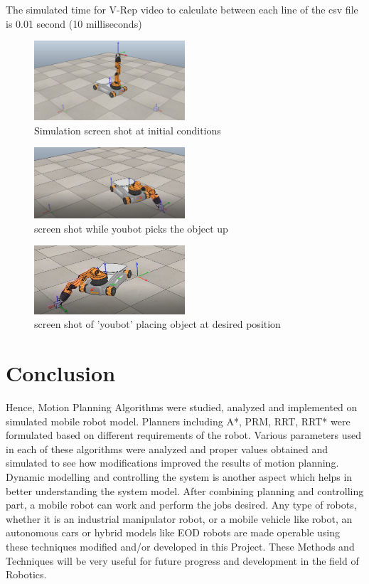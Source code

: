 \documentclass[12pt]{article}
\begin{document}
 The simulated time for V-Rep video to calculate between each line of the csv file is 0.01 second (10 milliseconds)

 
\begin{figure}[H]
\centering
\includegraphics[width=0.5\textwidth]{Initial_vrep_simulation.PNG}
\captionsetup{labelformat=empty}
\caption{Simulation screen shot at initial conditions}
\end{figure}
 
\begin{figure}[H]
\centering
\includegraphics[width=0.5\textwidth]{first_end.PNG}
\captionsetup{labelformat=empty}
\caption{screen shot while youbot picks the object up}
\end{figure}
 
\begin{figure}[H]
\centering
\includegraphics[width=0.5\textwidth]{final_end.PNG}
\captionsetup{labelformat=empty}
\caption{screen shot of 'youbot' placing object at desired position}
\end{figure}


\newpage
\section{Conclusion}
Hence, Motion Planning Algorithms were studied, analyzed and implemented on simulated mobile robot model. Planners including A*, PRM, RRT, RRT* were formulated based on different requirements of the robot. Various parameters used in each of these algorithms were analyzed and proper values obtained and simulated to see how modifications improved the results of motion planning. Dynamic modelling and controlling the system is another aspect which helps in better understanding the system model. After combining planning and controlling part, a mobile robot can work and perform the jobs desired. Any type of robots, whether it is an industrial manipulator robot, or a mobile vehicle like robot, an autonomous cars or hybrid models like EOD robots are made operable using these techniques modified and/or developed in this Project. These Methods and Techniques will be very useful for future progress and development in the field of Robotics.  
\newpage
\end{document}
